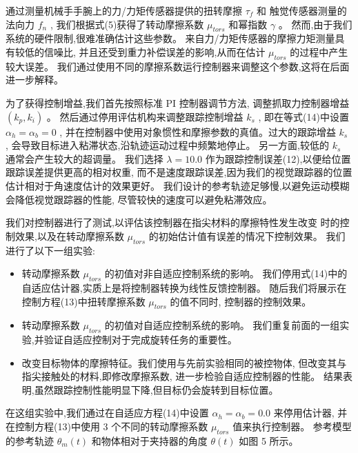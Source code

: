 通过测量机械手手腕上的力/力矩传感器提供的扭转摩擦 $\tau_f$ 和
触觉传感器测量的法向力 $f_n$ ,
我们根据式(5)获得了转动摩擦系数 $\mu_{tors}$ 和幂指数 $\gamma$ 。
然而,由于我们系统的硬件限制,很难准确估计这些参数。
来自力/力矩传感器的摩擦力矩测量具有较低的信噪比,
并且还受到重力补偿误差的影响,从而在估计 $\mu_{tors}$ 的过程中产生较大误差。
我们通过使用不同的摩擦系数运行控制器来调整这个参数,这将在后面进一步解释。

为了获得控制增益,我们首先按照标准 PI 控制器调节方法,
调整抓取力控制器增益 $\left( {{k_p},{k_i}} \right)$ 。
然后通过停用评估机构来调整跟踪控制增益 $k_s$ ,
即在等式(14)中设置 ${\alpha _h} = {\alpha _b} = 0$ ,
并在控制器中使用对象惯性和摩擦参数的真值。过大的跟踪增益 $k_s$ ,
会导致目标进入粘滞状态,沿轨迹运动过程中频繁地停止。
另一方面,较低的 $k_s$ 通常会产生较大的超调量。
我们选择 $\lambda = 10.0$ 作为跟踪控制误差(12),以便给位置跟踪误差提供更高的相对权重,
而不是速度跟踪误差,因为我们的视觉跟踪器的位置估计相对于角速度估计的效果更好。
我们设计的参考轨迹足够慢,以避免运动模糊会降低视觉跟踪器的性能,
尽管较快的速度可以避免粘滞效应。

我们对控制器进行了测试,以评估该控制器在指尖材料的摩擦特性发生改变
时的控制效果,以及在转动摩擦系数 $\mu_{tors}$ 的初始估计值有误差的情况下控制效果。
我们进行了以下一组实验:


\begin{itemize}
	\item 转动摩擦系数 $\mu_{tors}$ 的初值对非自适应控制系统的影响。
    我们停用式(14)中的自适应估计器,实质上是将控制器转换为线性反馈控制器。
    随后我们将展示在控制方程(13)中扭转摩擦系数 $\mu_{tors}$ 的值不同时,
    控制器的控制效果。
	\item 转动摩擦系数 $\mu_{tors}$ 的初值对自适应控制系统的影响。
		我们重复前面的一组实验,并验证自适应控制对于完成旋转任务的重要性。
	\item 改变目标物体的摩擦特征。我们使用与先前实验相同的被控物体,
		但改变其与指尖接触处的材料,即修改摩擦系数,
		进一步检验自适应控制器的性能。
		结果表明,虽然跟踪控制性能明显下降,但目标仍会旋转到目标位置。
\end{itemize}



在这组实验中,我们通过在自适应方程(14)中设置
${\alpha _h} = {\alpha _b} = 0.0$ 来停用估计器,
并在控制方程(13)中使用 3 个不同的转动摩擦系数 $\mu_{tors}$ 值来执行控制器。
参考模型的参考轨迹 $\theta_m(t)$ 和物体相对于夹持器的角度 $\theta(t)$ 如图 5 所示。

